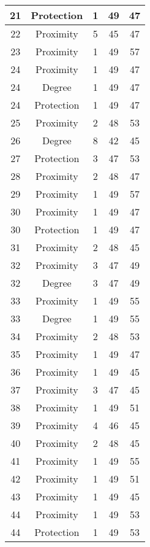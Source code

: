\documentclass[results.tex]{subfiles}
\begin{document}
\begin{center}
\begin{tabular}{| c || c | c | c | c |}
    21 & Protection & 1 & 49 & 47 \\ 
    \hline
    22 & Proximity & 5 & 45 & 47 \\ 
    \hline
    23 & Proximity & 1 & 49 & 57 \\ 
    \hline
    24 & Proximity & 1 & 49 & 47 \\ 
    \hline
    24 & Degree & 1 & 49 & 47 \\ 
    \hline
    24 & Protection & 1 & 49 & 47 \\ 
    \hline
    25 & Proximity & 2 & 48 & 53 \\ 
    \hline
    26 & Degree & 8 & 42 & 45 \\ 
    \hline
    27 & Protection & 3 & 47 & 53 \\ 
    \hline
    28 & Proximity & 2 & 48 & 47 \\ 
    \hline
    29 & Proximity & 1 & 49 & 57 \\ 
    \hline
    30 & Proximity & 1 & 49 & 47 \\ 
    \hline
    30 & Protection & 1 & 49 & 47 \\ 
    \hline
    31 & Proximity & 2 & 48 & 45 \\ 
    \hline
    32 & Proximity & 3 & 47 & 49 \\ 
    \hline
    32 & Degree & 3 & 47 & 49 \\ 
    \hline
    33 & Proximity & 1 & 49 & 55 \\ 
    \hline
    33 & Degree & 1 & 49 & 55 \\ 
    \hline
    34 & Proximity & 2 & 48 & 53 \\ 
    \hline
    35 & Proximity & 1 & 49 & 47 \\ 
    \hline
    36 & Proximity & 1 & 49 & 45 \\ 
    \hline
    37 & Proximity & 3 & 47 & 45 \\ 
    \hline
    38 & Proximity & 1 & 49 & 51 \\ 
    \hline
    39 & Proximity & 4 & 46 & 45 \\ 
    \hline
    40 & Proximity & 2 & 48 & 45 \\ 
    \hline
    41 & Proximity & 1 & 49 & 55 \\ 
    \hline
    42 & Proximity & 1 & 49 & 51 \\ 
    \hline
    43 & Proximity & 1 & 49 & 45 \\ 
    \hline
    44 & Proximity & 1 & 49 & 53 \\ 
    \hline
    44 & Protection & 1 & 49 & 53 \\ 

\end{tabular}
\end{center}
\end{document}
